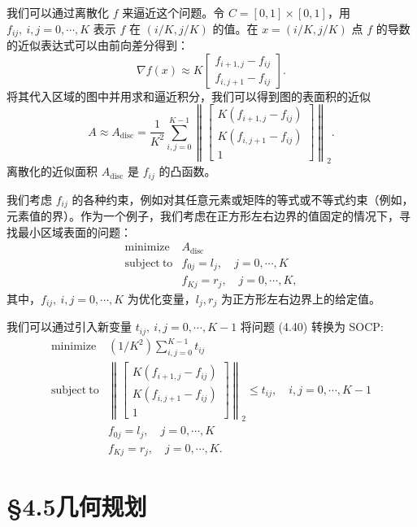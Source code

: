 \documentclass[UTF8, 12pt, fontset=fandol, oneside]{ctexart}
\begin{document}
我们可以通过离散化 $f$ 来逼近这个问题。令 $C=[0,1]\times[0,1]$，用 $f_{ij},\ i,j=0,\cdots,K$ 表示 $f$ 在 $(i/K,j/K)$ 的值。在 $x=(i/K,j/K)$ 点 $f$ 的导数的近似表达式可以由前向差分得到：
\[
\nabla f(x)\approx K
\begin{bmatrix}
f_{i+1,j}-f_{ij}\\
f_{i,j+1}-f_{ij}
\end{bmatrix}.
\]
将其代入区域的图中并用求和逼近积分，我们可以得到图的表面积的近似
\[
A\approx A_{\mathrm{disc}}=\frac{1}{K^2}\sum_{i,j=0}^{K-1}
\left\|
\begin{bmatrix}
K(f_{i+1,j}-f_{ij})\\
K(f_{i,j+1}-f_{ij})\\
1
\end{bmatrix}
\right\|_2.
\]
离散化的近似面积 $A_{\mathrm{disc}}$ 是 $f_{ij}$ 的凸函数。

我们考虑 $f_{ij}$ 的各种约束，例如对其任意元素或矩阵的等式或不等式约束（例如，元素值的界）。作为一个例子，我们考虑在正方形左右边界的值固定的情况下，寻找最小区域表面的问题：
\begin{equation}
\begin{array}{ll}
\mathop{\mathrm{minimize}} & A_{\mathrm{disc}}\\
\mathrm{subject\ to} & f_{0j}=l_j,\quad j=0,\cdots,K\\
& f_{Kj}=r_j,\quad j=0,\cdots,K,
\end{array}
\tag{4.40}
\end{equation}
其中，$f_{ij},\ i,j=0,\cdots,K$ 为优化变量，$l_j,r_j$ 为正方形左右边界上的给定值。

我们可以通过引入新变量 $t_{ij},\ i,j=0,\cdots,K-1$ 将问题 (4.40) 转换为 SOCP:
\[
\begin{array}{ll}
\mathop{\mathrm{minimize}} & (1/K^2)\displaystyle\sum_{i,j=0}^{K-1}t_{ij}\\
\mathrm{subject\ to} &
\left\|
\begin{bmatrix}
K(f_{i+1,j}-f_{ij})\\
K(f_{i,j+1}-f_{ij})\\
1
\end{bmatrix}
\right\|_2\leq t_{ij},\quad i,j=0,\cdots,K-1\\
& f_{0j}=l_j,\quad j=0,\cdots,K\\
& f_{Kj}=r_j,\quad j=0,\cdots,K.
\end{array}
\]

\section*{§4.5\quad 几何规划}
\end{document}
